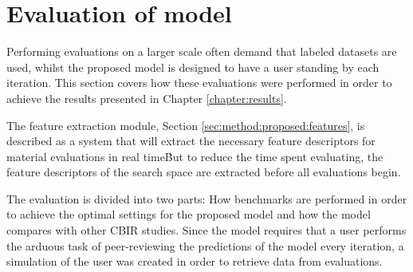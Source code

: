 
\section{Evaluation of model}
\label{sec:meth:evaluation}

Performing evaluations on a larger scale often demand that labeled datasets are used, whilst the proposed model is designed to have a user standing by each iteration. This section covers how these evaluations were performed in order to achieve the results presented in Chapter \ref{chapter:results}.

The feature extraction module, Section \ref{sec:method:proposed:features}, is described as a system that will extract the necessary feature descriptors for material evaluations in real time\. But to reduce the time spent evaluating, the feature descriptors of the search space are extracted before all evaluations begin.

The evaluation is divided into two parts: How benchmarks are performed in order to achieve the optimal settings for the proposed model and how the model compares with other CBIR studies. 
Since the model requires that a user performs the arduous task of peer-reviewing the predictions of the model every iteration, a simulation of the user was created in order to retrieve data from evaluations.






